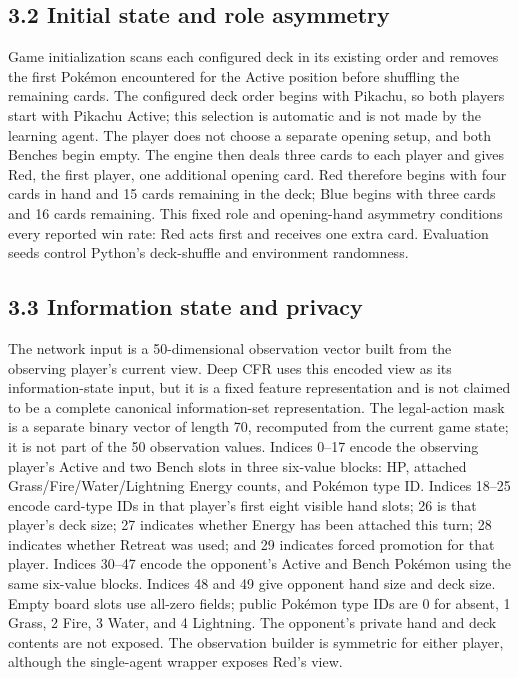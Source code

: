 \documentclass[11pt]{article}
\begin{document}
\subsection*{3.2 Initial state and role asymmetry}

Game initialization scans each configured deck in its existing order and removes the first Pok\'emon encountered for the Active position before shuffling the remaining cards. The configured deck order begins with Pikachu, so both players start with Pikachu Active; this selection is automatic and is not made by the learning agent. The player does not choose a separate opening setup, and both Benches begin empty. The engine then deals three cards to each player and gives Red, the first player, one additional opening card. Red therefore begins with four cards in hand and 15 cards remaining in the deck; Blue begins with three cards and 16 cards remaining. This fixed role and opening-hand asymmetry conditions every reported win rate: Red acts first and receives one extra card. Evaluation seeds control Python's deck-shuffle and environment randomness.

\subsection*{3.3 Information state and privacy}

The network input is a 50-dimensional observation vector built from the observing player's current view. Deep CFR uses this encoded view as its information-state input, but it is a fixed feature representation and is not claimed to be a complete canonical information-set representation. The legal-action mask is a separate binary vector of length 70, recomputed from the current game state; it is not part of the 50 observation values. Indices 0--17 encode the observing player's Active and two Bench slots in three six-value blocks: HP, attached Grass/Fire/Water/Lightning Energy counts, and Pok\'emon type ID. Indices 18--25 encode card-type IDs in that player's first eight visible hand slots; 26 is that player's deck size; 27 indicates whether Energy has been attached this turn; 28 indicates whether Retreat was used; and 29 indicates forced promotion for that player. Indices 30--47 encode the opponent's Active and Bench Pok\'emon using the same six-value blocks. Indices 48 and 49 give opponent hand size and deck size. Empty board slots use all-zero fields; public Pok\'emon type IDs are 0 for absent, 1 Grass, 2 Fire, 3 Water, and 4 Lightning. The opponent's private hand and deck contents are not exposed. The observation builder is symmetric for either player, although the single-agent wrapper exposes Red's view.
\end{document}
